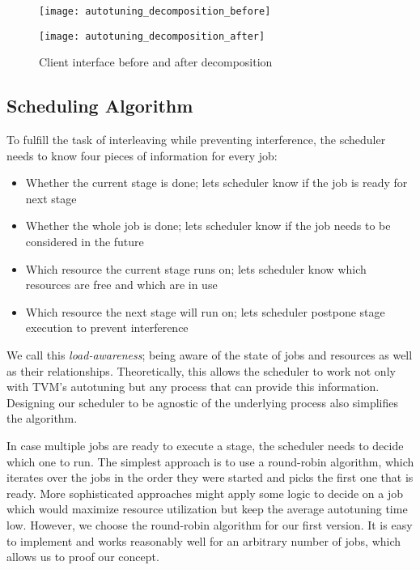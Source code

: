 \begin{figure}
	\begin{minipage}[b]{.5\textwidth}
		\centering\texttt{[image: autotuning\_decomposition\_before]}
		\label{fig:autotuning-decomposition-before}
	\end{minipage}%
	\begin{minipage}[b]{.5\textwidth}
		\centering\texttt{[image: autotuning\_decomposition\_after]}
		\label{fig:autotuning-decomposition-after}
	\end{minipage}
	\caption{Client interface before and after decomposition}
	\label{fig:autotuning-decomposition}
\end{figure}

\subsection{Scheduling Algorithm}
To fulfill the task of interleaving while preventing interference, the scheduler needs to know four pieces of information for every job:
\begin{itemize}
	\item Whether the current stage is done; lets scheduler know if the job is ready for next stage
	\item Whether the whole job is done; lets scheduler know if the job needs to be considered in the future
	\item Which resource the current stage runs on; lets scheduler know which resources are free and which are in use
	\item Which resource the next stage will run on; lets scheduler postpone stage execution to prevent interference
\end{itemize}
We call this \textit{load-awareness}; being aware of the state of jobs and resources as well as their relationships. Theoretically, this allows the scheduler to work not only with TVM's autotuning but any process that can provide this information. Designing our scheduler to be agnostic of the underlying process also simplifies the algorithm.

In case multiple jobs are ready to execute a stage, the scheduler needs to decide which one to run. The simplest approach is to use a round-robin algorithm, which iterates over the jobs in the order they were started and picks the first one that is ready. More sophisticated approaches might apply some logic to decide on a job which would maximize resource utilization but keep the average autotuning time low. However, we choose the round-robin algorithm for our first version. It is easy to implement and works reasonably well for an arbitrary number of jobs, which allows us to proof our concept.

